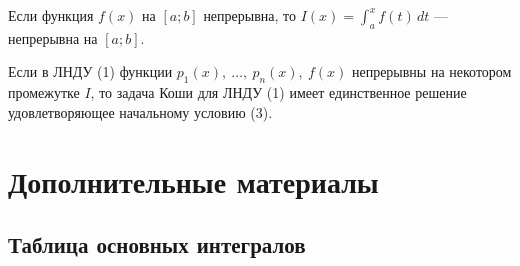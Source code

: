 \begin{theorem}[Непрерывность $I(x)$]
    Если функция $f(x)$ на $[a;b]$ непрерывна, то $I(x) = \int_{a}^{x} f(t)\, dt$ --- непрерывна на $[a;b]$.
\end{theorem}

\begin{theorem}
    Если в ЛНДУ (1) функции $p_1(x),\ \ldots,\ p_n(x),\ f(x)$ непрерывны на некотором промежутке $I$, то задача Коши для ЛНДУ (1) имеет единственное решение удовлетворяющее начальному условию (3).
\end{theorem}

\section{Дополнительные материалы}

\subsection{Таблица основных интегралов}


